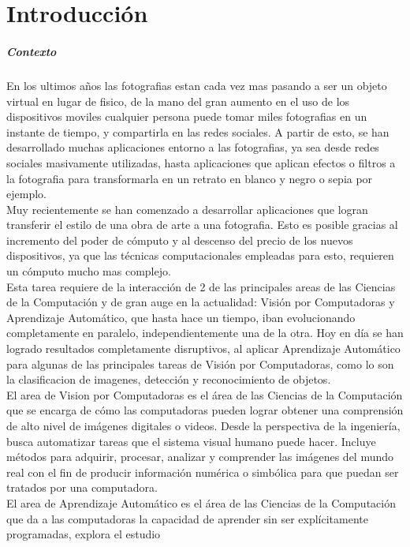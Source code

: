\documentclass[a4paper,11pt,spanish]{book}
\begin{document}
\tableofcontents 

\chapter{Introducción}
  \paragraph{Contexto}
    En los ultimos años las fotografias estan cada vez mas pasando a ser un objeto virtual en lugar de fisico, de la mano del gran aumento en el uso de los dispositivos moviles 
    cualquier persona puede tomar miles fotografias en un instante de tiempo, y compartirla en las redes sociales.
    A partir de esto, se han desarrollado muchas aplicaciones entorno a las fotografias, ya sea desde redes sociales masivamente utilizadas, hasta aplicaciones que aplican efectos o filtros 
    a la fotografia para transformarla en un retrato en blanco y negro o sepia por ejemplo. \\
    Muy recientemente se han comenzado a desarrollar aplicaciones que logran transferir el estilo de una obra de arte a una fotografia. Esto es posible gracias al incremento 
    del poder de cómputo y al descenso del precio de los nuevos dispositivos, ya que las técnicas computacionales empleadas para esto, requieren un cómputo mucho mas complejo.\\
    Esta tarea requiere de la interacción de 2 de las principales areas de las Ciencias de la Computación y de gran auge en la actualidad: Visión por Computadoras y Aprendizaje Automático,
    que hasta hace un tiempo, iban evolucionando completamente en paralelo, independientemente una de la otra. Hoy en día se han logrado resultados completamente disruptivos, al aplicar
    Aprendizaje Automático para algunas de las principales tareas de Visión por Computadoras, como lo son la clasificacion de imagenes, detección y reconocimiento de objetos.\\
    El area de Vision por Computadoras es el área de las Ciencias de la Computación que se encarga de cómo las computadoras pueden lograr obtener una comprensión de alto nivel de imágenes digitales o videos. 
    Desde la perspectiva de la ingeniería, busca automatizar tareas que el sistema visual humano puede hacer. Incluye métodos para adquirir, procesar, analizar y comprender las imágenes del mundo real 
    con el fin de producir información numérica o simbólica para que puedan ser tratados por una computadora.\\
    El area de Aprendizaje Automático es el área de las Ciencias de la Computación que da a las computadoras la capacidad de aprender sin ser explícitamente programadas, explora el estudio 
\end{document}
